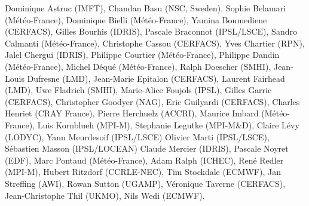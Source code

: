 Dominique Astruc (IMFT),
Chandan Basu (NSC, Sweden),
Sophie Belamari (M\'et\'eo-France),
Dominique Bielli (M\'et\'eo-France),
Yamina Boumediene (CERFACS), 
Gilles Bourhis (IDRIS),
Pascale Braconnot (IPSL/LSCE),
Sandro Calmanti (M\'et\'eo-France),
Christophe Cassou (CERFACS),
Yves Chartier (RPN),
Jalel Chergui (IDRIS),
Philippe Courtier (M\'et\'eo-France),
Philippe Dandin (M\'et\'eo-France),
Michel D\'equ\'e (M\'et\'eo-France),
Ralph Doescher (SMHI),
Jean-Louis Dufresne (LMD),
Jean-Marie Epitalon (CERFACS),
Laurent Fairhead (LMD),
Uwe Fladrich (SMHI),
Marie-Alice Foujols (IPSL),
Gilles Garric (CERFACS),
Christopher Goodyer (NAG),
Eric Guilyardi (CERFACS),
Charles Henriet (CRAY France),
Pierre Herchuelz (ACCRI),
Maurice Imbard (M\'et\'eo-France),
Luis Kornblueh (MPI-M),
Stephanie Legutke (MPI-M\&D),
Claire L\'evy (LODYC),
Yann Meurdesoif (IPSL/LSCE)
Olivier Marti (IPSL/LSCE),
S\'ebastien Masson (IPSL/LOCEAN)
Claude Mercier (IDRIS),
Pascale Noyret (EDF),
Marc Pontaud (M\'et\'eo-France),
Adam Ralph (ICHEC),
Ren\'e Redler (MPI-M),
Hubert Ritzdorf (CCRLE-NEC),
Tim Stockdale (ECMWF),
Jan Streffing (AWI),
Rowan Sutton (UGAMP),
V\'eronique Taverne (CERFACS),
Jean-Christophe Thil (UKMO),
Nils Wedi (ECMWF).



